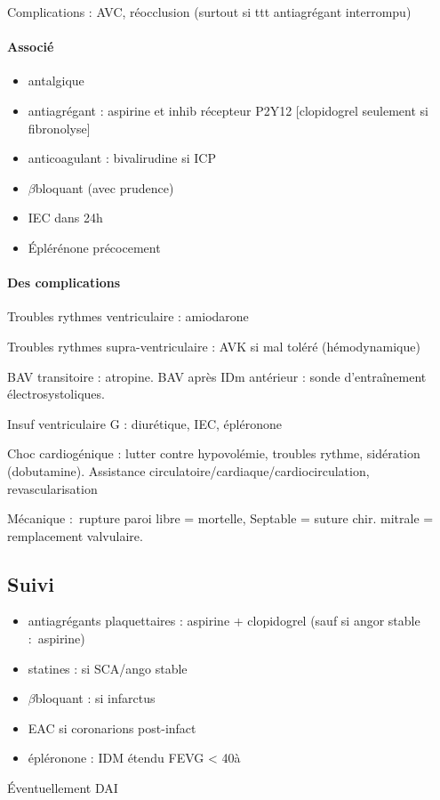 Complications : AVC, réocclusion (surtout si ttt antiagrégant interrompu)

\paragraph{Associé}
\begin{itemize}
  \item antalgique
  \item antiagrégant : aspirine et inhib récepteur P2Y12 [\danger clopidogrel
    seulement si fibronolyse]
  \item anticoagulant : bivalirudine si ICP
  \item $\beta$bloquant (avec prudence)
  \item IEC dans 24h
  \item Éplérénone précocement
\end{itemize}

\paragraph{Des complications}
Troubles rythmes ventriculaire : amiodarone

Troubles rythmes supra-ventriculaire : AVK si mal toléré (hémodynamique)

BAV transitoire : atropine. BAV après IDm antérieur : sonde d'entraînement
électrosystoliques.

Insuf ventriculaire G : diurétique, IEC, épléronone

Choc cardiogénique : lutter contre {hypovolémie, troubles rythme}, sidération
(dobutamine). Assistance circulatoire/cardiaque/cardiocirculation,
revascularisation

Mécanique : rupture paroi libre = mortelle, Septable = suture chir. mitrale =
remplacement valvulaire.

\subsection{Suivi}
\begin{itemize}
  \item antiagrégants plaquettaires : aspirine + clopidogrel (sauf si angor
    stable : aspirine)
  \item statines : si SCA/ango stable
  \item $\beta$bloquant : si infarctus
  \item EAC si coronarions post-infact
  \item épléronone : IDM étendu FEVG < 40à%
\end{itemize}
Éventuellement DAI

